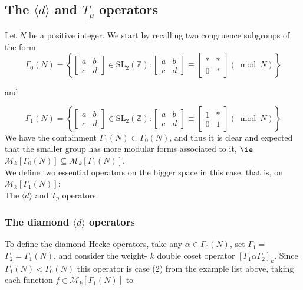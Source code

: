 \subsection{The $\langle d\rangle$ and $T_{p}$ operators}
Let $N$ be a positive integer. We start by recalling two congruence subgroups of the form 
$$
\Gamma_{0}(N)=\left\{\left[\begin{array}{ll}
a & b \\
c & d
\end{array}\right] \in \mathrm{SL}_{2}(\mathbb{Z}):\left[\begin{array}{ll}
a & b \\
c & d
\end{array}\right] \equiv\left[\begin{array}{ll}
* & * \\
0 & *
\end{array}\right](\bmod N)\right\}
$$

and

$$
\Gamma_{1}(N)=\left\{\left[\begin{array}{ll}
a & b \\
c & d
\end{array}\right] \in \mathrm{SL}_{2}(\mathbb{Z}):\left[\begin{array}{ll}
a & b \\
c & d
\end{array}\right] \equiv\left[\begin{array}{ll}
1 & * \\
0 & 1
\end{array}\right](\bmod N)\right\}
$$
We have the containment $\Gamma_{1}(N) \subset \Gamma_{0}(N)$, and thus it is clear and expected that the smaller group has more modular forms associated to it, $\ie$  $\mathcal{M}_{k}\left[\Gamma_{0}(N)\right] \subseteq \mathcal{M}_{k}\left[\Gamma_{1}(N)\right]$.\\
We define two essential operators on the bigger space in this case, that is, on $\mathcal{M}_{k}\left[\Gamma_{1}(N)\right]$: \\The $\langle d\rangle$ and $T_{p}$ operators.

\subsubsection{The diamond $\langle d \rangle $ operators}
To define the diamond Hecke operators, take any $\alpha \in \Gamma_{0}(N)$, set $\Gamma_{1}=$ $\Gamma_{2}=\Gamma_{1}(N)$, and consider the weight- $k$ double coset operator $\left[\Gamma_{1} \alpha \Gamma_{2}\right]_{k}$. Since $\Gamma_{1}(N) \triangleleft \Gamma_{0}(N)$ this operator is case (2) from the example list above, taking each function $f \in \mathcal{M}_{k}\left[\Gamma_{1}(N)\right]$ to

